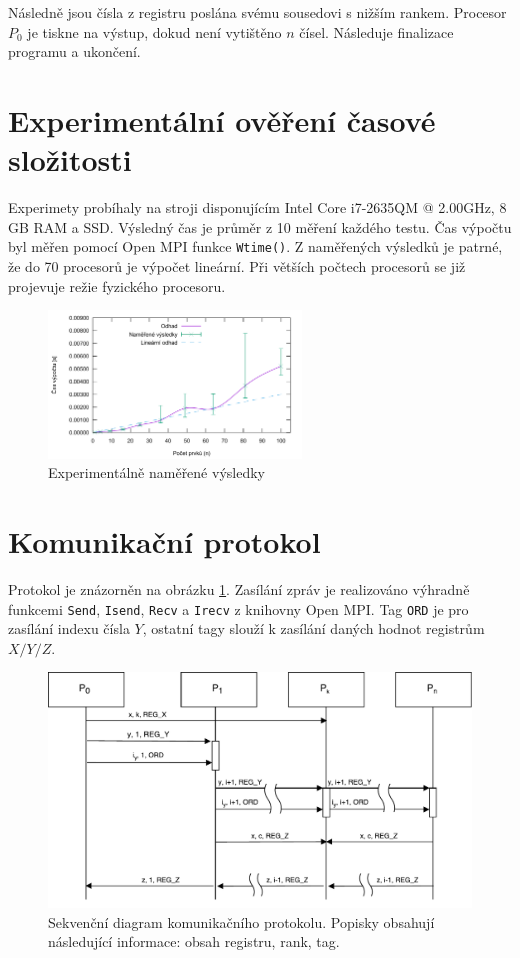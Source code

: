 \documentclass[11pt,a4paper]{article}
\begin{document}
Následně jsou čísla z registru poslána svému sousedovi s nižším rankem. Procesor $P_0$ je tiskne na výstup, dokud není vytištěno $n$ čísel. Následuje finalizace programu a ukončení.

\section{Experimentální ověření časové složitosti}

Experimety probíhaly na stroji disponujícím Intel Core i7-2635QM @ 2.00GHz, 8 GB RAM a SSD. Výsledný čas je průměr z 10 měření každého testu. Čas výpočtu byl měřen pomocí Open MPI funkce \texttt{Wtime()}. Z naměřených výsledků je patrné, že do 70 procesorů je výpočet lineární. Při větších počtech procesorů se již projevuje režie fyzického procesoru.

\begin{figure}[!ht]
    \centering
		\includegraphics[width=0.6\textwidth]{results}
    \caption{Experimentálně naměřené výsledky}
\end{figure}

\section{Komunikační protokol}
\label{proto}

Protokol je znázorněn na obrázku \ref{proto_schema}. Zasílání zpráv je realizováno výhradně funkcemi \texttt{Send}, \texttt{Isend}, \texttt{Recv} a \texttt{Irecv} z knihovny Open MPI. Tag \texttt{ORD} je pro zasílání indexu čísla $Y$, ostatní tagy slouží k zasílání daných hodnot registrům $X/Y/Z$.

\begin{figure}[!h]
    \includegraphics[width=0.8\linewidth]{protokol}
    \centering
    \caption{Sekvenční diagram komunikačního protokolu. Popisky obsahují následující informace: obsah registru, rank, tag.}
    \label{proto_schema}
\end{figure}
\end{document}
